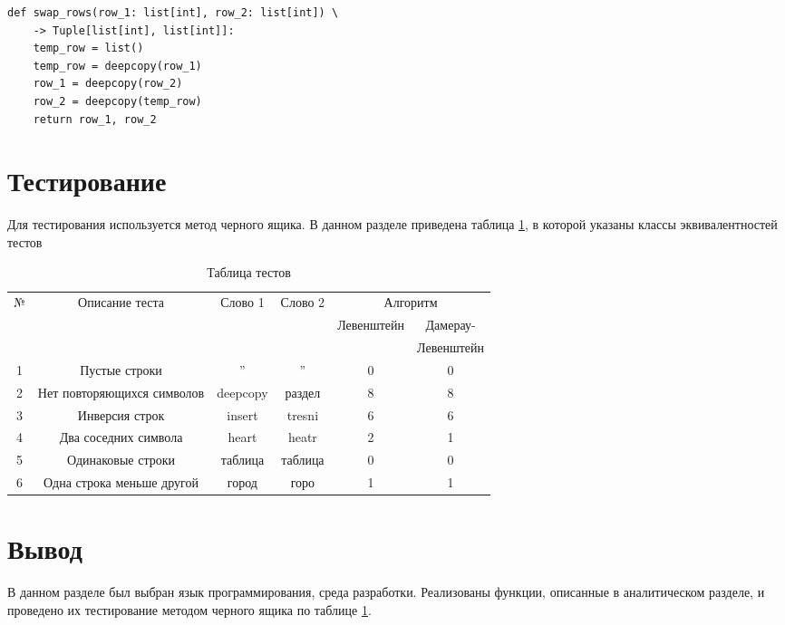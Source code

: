 \begin{lstlisting}[label=some-code,caption=Программный код создания для кэша в виде строки]
	def swap_rows(row_1: list[int], row_2: list[int]) \
	-> Tuple[list[int], list[int]]:
	temp_row = list()
	temp_row = deepcopy(row_1)
	row_1 = deepcopy(row_2)
	row_2 = deepcopy(temp_row)
	return row_1, row_2
\end{lstlisting}

\section{Тестирование}
Для тестирования используется метод черного ящика. В данном разделе приведена таблица \ref{table:ref1}, в которой указаны классы эквивалентностей тестов \\

\begin{table}[ht!]
	\centering
	\caption{Таблица тестов}
	\label{table:ref1}
	\begin{tabular}{|c|c|c|c|c|c|}
		\hline
		\multirow{3}{*}{№} & \multirow{3}{*}{Описание теста} & \multirow{3}{*}{Слово 1}  &  \multirow{3}{*}{Слово 2}   & \multicolumn{2}{|c|}{Алгоритм}\\ \cline{5-6}
		&                &          &            &\multirow{2}{*}{Левенштейн}   &Дамерау-	\\ 
		&                &          &            &             &Левенштейн       	        \\ \hline
		1& Пустые строки  &  ''      &    ''      &   0         &  0 						\\ \hline
		2& Нет повторяющихся символов & deepcopy & раздел & 8   &  8                       \\ \hline
		3& Инверсия строк & insert   &tresni      &   6         &  6                       \\ \hline
		4& Два соседних символа       & heart    & heatr  & 2   &  1                       \\ \hline
		5& Одинаковые строки          & таблица  & таблица& 0   &  0						\\ \hline
		6& Одна строка меньше другой  & город    & горо   & 1   &  1						\\ \hline
	\end{tabular}
\end{table}

\section{Вывод}
В данном разделе был выбран язык программирования, среда разработки. Реализованы функции, описанные в аналитическом разделе, и проведено их тестирование методом черного ящика по таблице \ref{table:ref1}. 


